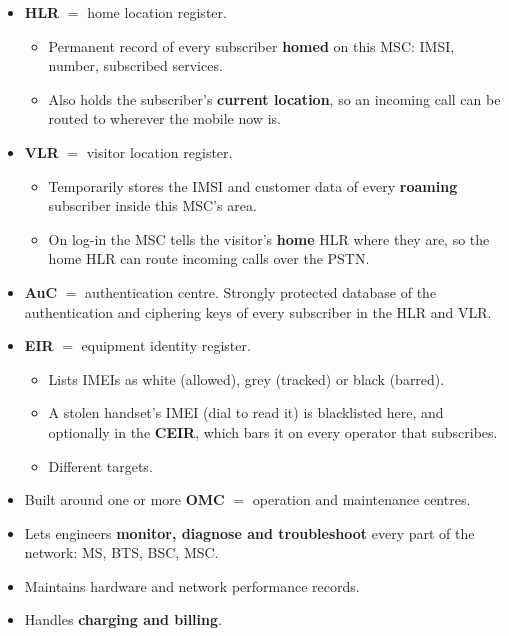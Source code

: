 {\begin{itemize}
  \item \textbf{HLR} $=$ home location register.
  \begin{itemize}
    \item Permanent record of every subscriber \textbf{homed} on this MSC: IMSI, number,
          subscribed services.
    \item Also holds the subscriber's \textbf{current location}, so an incoming call can be
          routed to wherever the mobile now is.
  \end{itemize}
  \item \textbf{VLR} $=$ visitor location register.
  \begin{itemize}
    \item Temporarily stores the IMSI and customer data of every \textbf{roaming}
          subscriber inside this MSC's area.
    \item On log-in the MSC tells the visitor's \textbf{home} HLR where they are, so the
          home HLR can route incoming calls over the PSTN.
  \end{itemize}
  \item \textbf{AuC} $=$ authentication centre. Strongly protected database of the
        authentication and ciphering keys of every subscriber in the HLR and VLR.
  \item \textbf{EIR} $=$ equipment identity register.
  \begin{itemize}
    \item Lists IMEIs as white (allowed), grey (tracked) or black (barred).
    \item A stolen handset's IMEI (dial  to read it) is blacklisted here, and
          optionally in the \textbf{CEIR}, which bars it on every operator that subscribes.
    \item {} Different targets.
  \end{itemize}
\end{itemize}}

\begin{itemize}
  \item Built around one or more \textbf{OMC} $=$ operation and maintenance centres.
  \item Lets engineers \textbf{monitor, diagnose and troubleshoot} every part of the
        network: MS, BTS, BSC, MSC.
  \item Maintains hardware and network performance records.
  \item Handles \textbf{charging and billing}.
\end{itemize}

